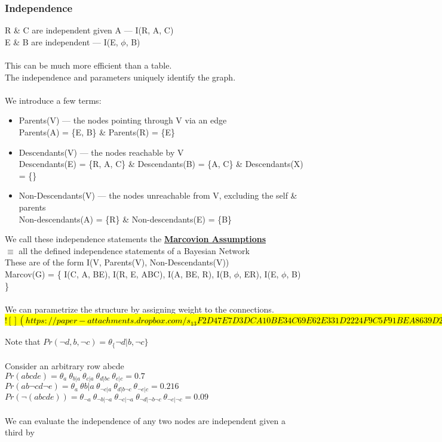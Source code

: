 \documentclass[../../lecture_notes.tex]{subfiles}
\begin{document}
\subsubsection*{Independence}
\noindent R \& C are independent given A — I(R, A, C)\\
E \& B are independent — I(E, $\phi$, B)\\
\\
This can be much more efficient than a table.\\
The independence and parameters uniquely identify the graph.\\
\\
We introduce a few terms:
\begin{itemize} [itemsep=0mm]
	\item Parents(V) — the nodes pointing through V via an edge\\
		Parents(A) = \{E, B\} \& Parents(R) = \{E\}
	\item Descendants(V) — the nodes reachable by V\\
           	Descendants(E) = \{R, A, C\} \& Descendants(B) = \{A, C\} \& Descendants(X) = \{\}
	\item Non-Descendants(V) — the nodes unreachable from V, excluding the self \& parents\\
		Non-descendants(A) = \{R\} \& Non-descendants(E) = \{B\}
\end{itemize}

\noindent We call these independence statements the \textbf{\underline{Marcovion Assumptions}}\\
	\indent $\equiv$ all the defined independence statements of a Bayesian Network\\
	\indent These are of the form I(V, Parents(V), Non-Descendants(V))\\
Marcov(G) = \{ I(C, A, BE), I(R, E, ABC), I(A, BE, R), I(B, $\phi$, ER), I(E, $\phi$, B) \}\\
\\
We can parametrize the structure by assigning weight to the connections.\\

\hl{
$![](https://paper-attachments.dropbox.com/s_13F2D47E7D3DCA10BE34C69E62E331D2224F9C5F91BEA8639D242F2792B86517_1590117208298_Screen+Shot+2020-05-21+at+8.13.19+PM.png)$
}

\noindent Note that $Pr(\neg d, b, \neg c) = \theta_\{\neg d | b, \neg c\}$\\
\\
Consider an arbitrary row abcde \\ 
\indent $Pr(abcde) =\theta_a\ \theta_{b|a}\ \theta_{c|a}\ \theta_{d|bc}\ \theta_{e|c} = 0.7$\\
\indent $Pr(ab\neg cd\neg e) =\theta_{a}\ \theta{b|a}\ \theta_{\neg c|a}\ \theta_{d|b\neg c}\ \theta_{\neg e|c} = 0.216$\\
\indent $Pr(\neg(abcde)) = \theta_{\neg a}\ \theta_{\neg b|\neg a}\ \theta_{\neg c|\neg a}\
	\theta_{\neg d|\neg b\neg c}\ \theta_{\neg e|\neg c} = 0.09$\\
\\
We can evaluate the independence of any two nodes are independent given a third by
\end{document}
